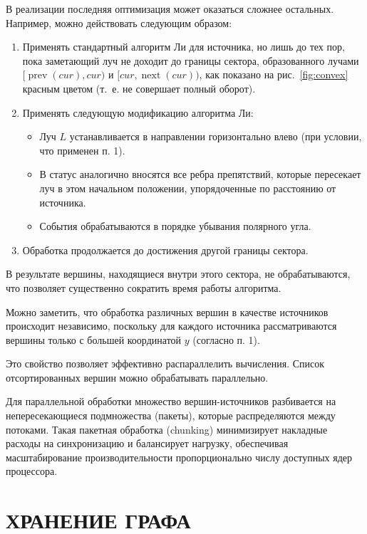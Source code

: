 \documentclass[intlimits,twoside,a4paper,11pt]{article}
\theoremstyle{definition}
\begin{document}
В реализации последняя оптимизация может оказаться сложнее остальных.
Например, можно действовать следующим образом:
\begin{enumerate}
   \item Применять стандартный алгоритм Ли для источника, но лишь до тех пор, пока заметающий луч не доходит до границы сектора,
       образованного лучами $[\operatorname{prev}(\mathit{cur}), \mathit{cur})$ и $[\mathit{cur}, \operatorname{next}(\mathit{cur}))$, 
       как показано на рис.~\ref{fig:convex} красным цветом (т.~е. не совершает полный оборот).
    \item Применять следующую модификацию алгоритма Ли:
        \begin{itemize}
            \item Луч $L$ устанавливается в направлении горизонтально влево (при условии, что применен п. 1).
            \item В статус аналогично вносятся все ребра препятствий, которые пересекает луч в этом начальном положении,
                  упорядоченные по расстоянию от источника.
            \item События обрабатываются в порядке убывания полярного угла.
        \end{itemize}
    \item Обработка продолжается до достижения другой границы сектора.
\end{enumerate}
В результате вершины, находящиеся внутри этого сектора, не обрабатываются, что позволяет существенно
сократить время работы алгоритма.

Можно заметить, что обработка различных вершин в качестве источников происходит независимо, 
поскольку для каждого источника рассматриваются вершины только с большей координатой $y$ (согласно п. 1). 

Это свойство позволяет эффективно распараллелить вычисления. Список отсортированных вершин можно обрабатывать параллельно. 

Для параллельной обработки множество вершин-источников разбивается на непересекающиеся подмножества (пакеты),
которые распределяются между потоками. Такая пакетная обработка (chunking) минимизирует накладные расходы на
синхронизацию и балансирует нагрузку, обеспечивая масштабирование производительности пропорционально числу доступных ядер процессора.

\section{ХРАНЕНИЕ ГРАФА}
\end{document}
